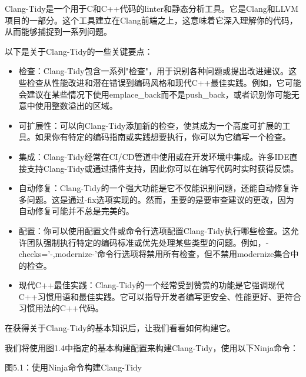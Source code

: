 


Clang-Tidy是一个用于C和C++代码的linter和静态分析工具。它是Clang和LLVM项目的一部分。这个工具建立在Clang前端之上，这意味着它深入理解你的代码，从而能够捕捉到一系列问题。

以下是关于Clang-Tidy的一些关键要点：

\begin{itemize}
\item
检查：Clang-Tidy包含一系列"检查"，用于识别各种问题或提出改进建议。这些检查从性能改进和潜在错误到编码风格和现代C++最佳实践。例如，它可能会建议在某些情况下使用emplace\_back而不是push\_back，或者识别你可能无意中使用整数溢出的区域。

\item
可扩展性：可以向Clang-Tidy添加新的检查，使其成为一个高度可扩展的工具。如果你有特定的编码指南或实践想要执行，你可以为它编写一个检查。

\item
集成：Clang-Tidy经常在CI/CD管道中使用或在开发环境中集成。许多IDE直接支持Clang-Tidy或通过插件支持，因此你可以在编写代码时实时获得反馈。

\item
自动修复：Clang-Tidy的一个强大功能是它不仅能识别问题，还能自动修复许多问题。这是通过-fix选项实现的。然而，重要的是要审查建议的更改，因为自动修复可能并不总是完美的。

\item
配置：你可以使用配置文件或命令行选项配置Clang-Tidy执行哪些检查。这允许团队强制执行特定的编码标准或优先处理某些类型的问题。例如，-checks='-,modernize-'命令行选项将禁用所有检查，但不禁用modernize集合中的检查。

\item
现代C++最佳实践：Clang-Tidy的一个经常受到赞赏的功能是它强调现代C++习惯用语和最佳实践。它可以指导开发者编写更安全、性能更好、更符合习惯用法的C++代码。
\end{itemize}

在获得关于Clang-Tidy的基本知识后，让我们看看如何构建它。


我们将使用图1.4中指定的基本构建配置来构建Clang-Tidy，使用以下Ninja命令：



\begin{center}
图5.1：使用Ninja命令构建Clang-Tidy
\end{center}

